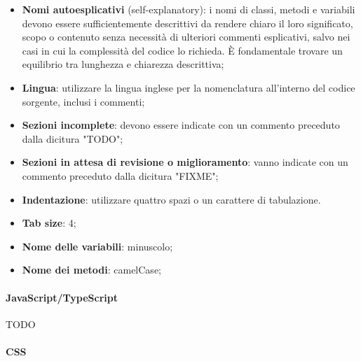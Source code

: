 \begin{itemize}
  \item \textbf{Nomi autoesplicativi} (self-explanatory): i nomi di classi, metodi e variabili devono essere sufficientemente descrittivi da rendere chiaro il loro significato, scopo o contenuto senza necessità di ulteriori commenti esplicativi, salvo nei casi in cui la complessità del codice lo richieda. È fondamentale trovare un equilibrio tra lunghezza e chiarezza descrittiva;
  \item \textbf{Lingua}: utilizzare la lingua inglese per la nomenclatura all'interno del codice sorgente, inclusi i commenti;
  \item \textbf{Sezioni incomplete}: devono essere indicate con un commento preceduto dalla dicitura "TODO";
  \item \textbf{Sezioni in attesa di revisione o miglioramento}: vanno indicate con un commento preceduto dalla dicitura "FIXME";
  \item \textbf{Indentazione}: utilizzare quattro spazi o un carattere di tabulazione.
\end{itemize}

\begin{itemize}
  \item \textbf{Tab size}: 4;
  \item \textbf{Nome delle variabili}: minuscolo;
  \item \textbf{Nome dei metodi}: camelCase;
\end{itemize}

\paragraph{JavaScript/TypeScript}
TODO

\paragraph{CSS}

